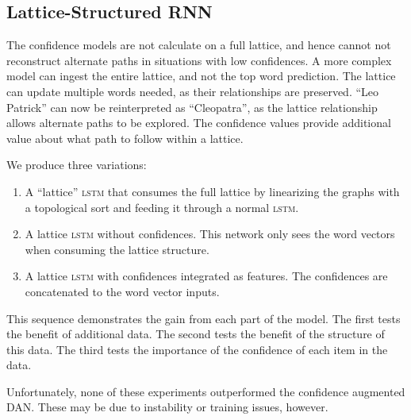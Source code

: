 \subsection{Lattice-Structured RNN}

The confidence models are not calculate on a full lattice, and hence cannot not reconstruct alternate paths in situations with low confidences.
A more complex model can ingest the entire lattice, and not the top word prediction.
The lattice can update multiple words needed, as their relationships are preserved.
``Leo Patrick'' can now be reinterpreted as ``Cleopatra'', as the lattice relationship allows alternate paths to be explored.
The confidence values provide additional value about what path to follow within a lattice.

We produce three variations:
\begin{enumerate}
\item  A ``lattice'' \textsc{lstm}  that consumes the full lattice by linearizing the graphs with a topological sort and feeding it through a normal \textsc{lstm}.  
\item  A lattice \textsc{lstm}  without confidences.   This network only sees the word vectors when consuming the lattice structure.
\item  A lattice \textsc{lstm}  with confidences integrated as features.  The confidences are concatenated to the word vector inputs.
\end{enumerate}

This sequence demonstrates the gain from each part of the model.
The first tests the benefit of additional data.
The second tests the benefit of the structure of this data.
The third tests the importance of the confidence of each item in the data.

Unfortunately, none of these experiments outperformed the confidence augmented \textsc{DAN}.
These may be due to instability or training issues, however.
